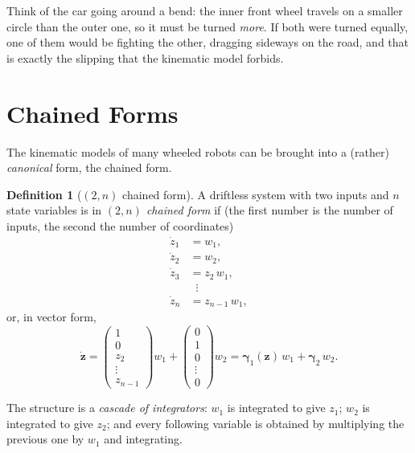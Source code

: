 \documentclass[11pt,a4paper]{article}
\theoremstyle{definition}
\newtheorem{definition}{Definition}[section]
\theoremstyle{plain}
\newcommand{\zv}{\bm{z}}
\begin{document}
\begin{intuition}
Think of the car going around a bend: the inner front wheel travels on a smaller circle than the outer one, so it must be turned \emph{more}. If both were turned equally, one of them would be fighting the other, dragging sideways on the road, and that is exactly the slipping that the kinematic model forbids.
\end{intuition}

\section{Chained Forms}

The kinematic models of many wheeled robots can be brought into a (rather) \emph{canonical} form, the chained form.

\begin{definition}[$(2,n)$ chained form]\label{def:chained}
A driftless system with two inputs and $n$ state variables is in \emph{$(2,n)$ chained form} if (the first number is the number of inputs, the second the number of coordinates)
\begin{align*}
  \dot z_1 &= w_1,\\
  \dot z_2 &= w_2,\\
  \dot z_3 &= z_2\,w_1,\\
  &\;\;\vdots\\
  \dot z_n &= z_{n-1}\,w_1 ,
\end{align*}
or, in vector form,
\[
  \dot{\zv}=\begin{pmatrix}1\\0\\z_2\\\vdots\\z_{n-1}\end{pmatrix}w_1+\begin{pmatrix}0\\1\\0\\\vdots\\0\end{pmatrix}w_2
  = \bm{\gamma}_1(\zv)\,w_1+\bm{\gamma}_2\,w_2 .
\]
\end{definition}

The structure is a \emph{cascade of integrators}: $w_1$ is integrated to give $z_1$; $w_2$ is integrated to give $z_2$; and every following variable is obtained by multiplying the previous one by $w_1$ and integrating.
\end{document}

